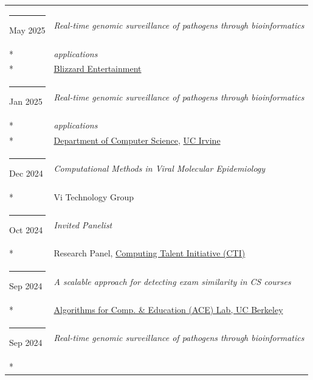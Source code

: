 \documentclass[margin,line]{res}
\begin{document}
\begin{resume}
\begin{longtable}{@{}p{0.7in}p{4in}}
\hspace*{-4mm} \rule{-1mm}{5mm} May 2025 & \textit{Real-time genomic surveillance of pathogens through bioinformatics}\\*
\hspace*{-4mm} & \hspace{4mm} \textit{applications}\\*
\hspace*{-4mm} & \hspace{4mm} \href{https://www.blizzard.com/}{Blizzard Entertainment}\\
\hspace*{-4mm} \rule{-1mm}{5mm} Jan 2025 & \textit{Real-time genomic surveillance of pathogens through bioinformatics}\\*
\hspace*{-4mm} & \hspace{4mm} \textit{applications}\\*
\hspace*{-4mm} & \hspace{4mm} \href{https://ics.uci.edu/}{Department of Computer Science}, \href{https://uci.edu/}{UC Irvine}\\
\hspace*{-4mm} \rule{-1mm}{5mm} Dec 2024 & \textit{Computational Methods in Viral Molecular Epidemiology}\\*
\hspace*{-4mm} & \hspace{4mm} Vi Technology Group\\
\hspace*{-4mm} \rule{-1mm}{5mm} Oct 2024 & \textit{Invited Panelist}\\*
\hspace*{-4mm} & \hspace{4mm} Research Panel, \href{https://computingtalentinitiative.org/}{Computing Talent Initiative (CTI)}\\
\hspace*{-4mm} \rule{-1mm}{5mm} Sep 2024 & \textit{A scalable approach for detecting exam similarity in CS courses}\\*
\hspace*{-4mm} & \hspace{4mm} \href{https://acelab.berkeley.edu/}{Algorithms for Comp. \& Education (ACE) Lab, UC Berkeley}\\
\hspace*{-4mm} \rule{-1mm}{5mm} Sep 2024 & \textit{Real-time genomic surveillance of pathogens through bioinformatics}\\*

\end{longtable}
\end{resume}
\end{document}
